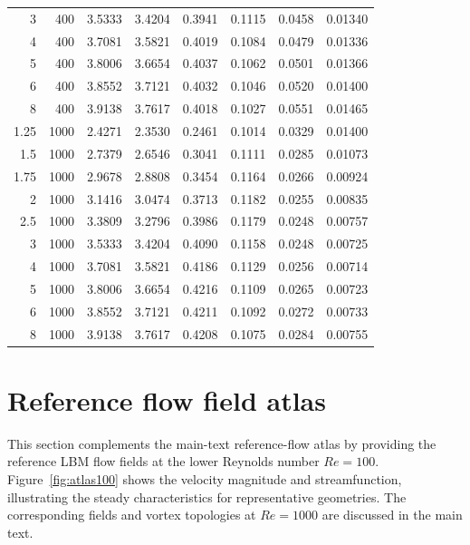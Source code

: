 \documentclass[11pt]{article}
\begin{document}
\begin{table}[H]
\begin{tabular}{@{}rrrrrrrr@{}}
    3 &  400 &  3.5333 &  3.4204 &  0.3941 &  0.1115 &  0.0458 &  0.01340 \\
    4 &  400 &  3.7081 &  3.5821 &  0.4019 &  0.1084 &  0.0479 &  0.01336 \\
    5 &  400 &  3.8006 &  3.6654 &  0.4037 &  0.1062 &  0.0501 &  0.01366 \\
    6 &  400 &  3.8552 &  3.7121 &  0.4032 &  0.1046 &  0.0520 &  0.01400 \\
    8 &  400 &  3.9138 &  3.7617 &  0.4018 &  0.1027 &  0.0551 &  0.01465 \\
 1.25 & 1000 &  2.4271 &  2.3530 &  0.2461 &  0.1014 &  0.0329 &  0.01400 \\
  1.5 & 1000 &  2.7379 &  2.6546 &  0.3041 &  0.1111 &  0.0285 &  0.01073 \\
 1.75 & 1000 &  2.9678 &  2.8808 &  0.3454 &  0.1164 &  0.0266 &  0.00924 \\
    2 & 1000 &  3.1416 &  3.0474 &  0.3713 &  0.1182 &  0.0255 &  0.00835 \\
  2.5 & 1000 &  3.3809 &  3.2796 &  0.3986 &  0.1179 &  0.0248 &  0.00757 \\
    3 & 1000 &  3.5333 &  3.4204 &  0.4090 &  0.1158 &  0.0248 &  0.00725 \\
    4 & 1000 &  3.7081 &  3.5821 &  0.4186 &  0.1129 &  0.0256 &  0.00714 \\
    5 & 1000 &  3.8006 &  3.6654 &  0.4216 &  0.1109 &  0.0265 &  0.00723 \\
    6 & 1000 &  3.8552 &  3.7121 &  0.4211 &  0.1092 &  0.0272 &  0.00733 \\
    8 & 1000 &  3.9138 &  3.7617 &  0.4208 &  0.1075 &  0.0284 &  0.00755 \\
\bottomrule
\end{tabular}
\end{table}
\par

\section{Reference flow field atlas}\label{sec:atlas}
This section complements the main-text reference-flow atlas by providing the reference LBM flow fields at the lower Reynolds number $Re=100$. Figure~\ref{fig:atlas100} shows the velocity magnitude and streamfunction, illustrating the steady characteristics for representative geometries. The corresponding fields and vortex topologies at $Re=1000$ are discussed in the main text.
\end{document}
